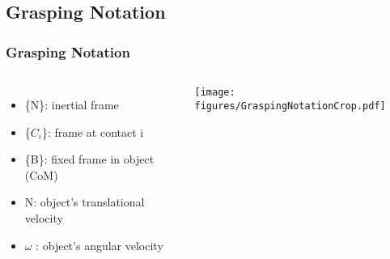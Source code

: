 \documentclass{beamer}
\begin{document}
\subsection{Grasping Notation}
\begin{frame}
\frametitle{Grasping Notation}

\begin{columns}[c] 
\begin{itemize}
\item \{N\}: inertial frame \vspace{0.2cm}
\item \{$C_i$\}: frame at contact i \vspace{0.2cm}
\item \{B\}: fixed frame in object (CoM) \vspace{0.2cm}
\item N: object's translational velocity \vspace{0.2cm}
\item $\omega$ : object's angular velocity \vspace{0.2cm}
\end{itemize}

\centering
 \texttt{[image: figures/GraspingNotationCrop.pdf]}
\end{columns}

\end{frame}

\end{document}
